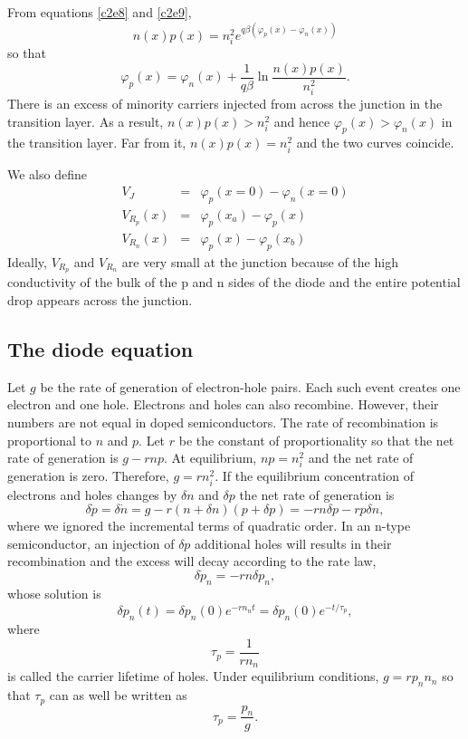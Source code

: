 From equations \eqref{c2e8} and \eqref{c2e9},
\[
n(x)p(x) = n_i^2e^{q\beta(\varphi_p(x) - \varphi_n(x))}
\]
so that
\begin{equation}\label{c2e82}
\varphi_p(x) = \varphi_n(x) + \frac{1}{q\beta}\ln\frac{n(x)p(x)}{n_i^2}.
\end{equation}
There is an excess of minority carriers injected from across the junction in 
the transition layer. As a result, $n(x)p(x) > n_i^2$ and hence $\varphi_p(x)
> \varphi_n(x)$ in the transition layer. Far from it, $n(x)p(x) = n_i^2$ and
the two curves coincide.

We also define 
\begin{eqnarray}
V_J &=& \varphi_p(x=0) - \varphi_n(x=0) \label{c2e83} \\
V_{R_p}(x) &=& \varphi_p(x_a) - \varphi_p(x) \label{c2e84} \\
V_{R_n}(x) &=& \varphi_p(x) - \varphi_p(x_b) \label{c2e85}
\end{eqnarray}
Ideally, $V_{R_p}$ and $V_{R_n}$ are very small at the junction because of the
high conductivity of the bulk of the p and n sides of the diode and the entire
potential drop appears across the junction.

\subsection{The diode equation}
Let $g$ be the rate of generation of electron-hole pairs. Each such event 
creates one
electron and one hole. Electrons and holes can also recombine. However, their
numbers are not equal in doped semiconductors. The rate of recombination is
proportional to $n$ and $p$. Let $r$ be the constant of proportionality so that
the net rate of generation is $g - rnp$. At equilibrium, $np = n_i^2$ and the
net rate of generation is zero. Therefore, $g = rn_i^2$. If the equilibrium
concentration of electrons and holes changes by $\delta n$ and $\delta p$ the
net rate of generation is
\begin{equation}\label{c2e86}
\delta\dot{p} = \delta\dot{n} = g - r(n + \delta n)(p + \delta p) =
-rn\delta p - rp\delta n,
\end{equation}
where we ignored the incremental terms of quadratic order. In an n-type 
semiconductor, an injection of $\delta p$ additional holes will results in their
recombination and the excess will decay according to the rate law,
\begin{equation}\label{c2e87}
\delta{\dot{p}_n} = -rn\delta p_n,
\end{equation}
whose solution is 
\begin{equation}\label{c2e88}
\delta p_n(t) = \delta p_n(0) e^{-rn_nt} = \delta p_n(0) e^{-t/\tau_p},
\end{equation}
where
\begin{equation}\label{c2e89}
\tau_p = \frac{1}{rn_n}
\end{equation}
is called the carrier lifetime of holes. Under equilibrium  conditions, $g = 
rp_nn_n$ so that $\tau_p$ can as well be written as
\begin{equation}\label{c2e90}
\tau_p = \frac{p_n}{g}.
\end{equation}

